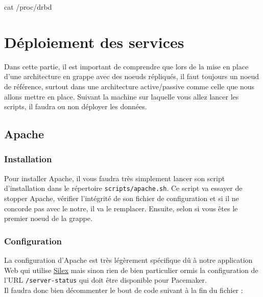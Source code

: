 \documentclass[11pt,a4paper]{report}
\begin{document}
                \begin{bashcode}
                    cat /proc/drbd
                \end{bashcode}
                
        \section{Déploiement des services}
            
            Dans cette partie, il est important de comprendre que lors de la mise en place d'une architecture en grappe avec des noeuds répliqués, il faut toujours un noeud de référence, surtout dans une architecture active/passive comme celle que nous allons mettre en place.
            Suivant la machine sur laquelle vous allez lancer les scripts, il faudra ou non déployer les données.
        
            \subsection{Apache}
                
                \subsubsection{Installation}
                
                    Pour installer Apache, il vous faudra très simplement lancer son script d'installation dans le répertoire \verb+scripts/apache.sh+.
                    Ce script va essayer de stopper Apache, vérifier l'intégrité de son fichier de configuration et si il ne concorde pas avec le notre, il va le remplacer. Ensuite, selon si vous êtes le premier noeud de la grappe.
                
                \subsubsection{Configuration}
                    
                    La configuration d'Apache est très légèrement spécifique dû à notre application Web qui utilise \underline{\href{http://silex.sensiolabs.org}{Silex}} mais sinon rien de bien particulier ormis la configuration de l'URL \verb+/server-status+ qui doit être disponible pour Pacemaker.\\
                    
                    Il faudra donc bien décommenter le bout de code suivant à la fin du fichier :\\
                  
\end{document}
